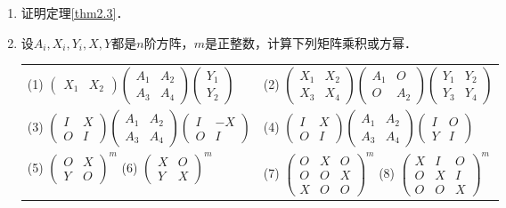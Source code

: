 \documentclass[a4paper,fontset=windows]{ctexbook}
\theoremstyle{definition}
\begin{document}
\begin{enumerate}
\item 证明定理\ref{thm2.3}．

\item 设$A_i,X_i,Y_i,X,Y$都是$n$阶方阵，$m$是正整数，计算下列矩阵乘积或方幂．

\hspace*{-6pt}\begin{tabular}{l@{\qquad}l}
(1) $\begin{pmatrix}X_1&X_2\end{pmatrix}\begin{pmatrix}A_1&A_2 \\ A_3&A_4\end{pmatrix}\begin{pmatrix}Y_1\\ Y_2\end{pmatrix}$ &
(2) $\begin{pmatrix}X_1&X_2 \\ X_3&X_4\end{pmatrix}\begin{pmatrix}A_1&O \\ O&A_2\end{pmatrix}\begin{pmatrix}Y_1&Y_2\\ Y_3&Y_4\end{pmatrix}$ \\
(3) $\begin{pmatrix}I&X \\ O&I\end{pmatrix}\begin{pmatrix}A_1&A_2 \\ A_3&A_4\end{pmatrix}\begin{pmatrix}I&-X\\ O&I\end{pmatrix}$ &
(4) $\begin{pmatrix}I&X \\ O&I\end{pmatrix}\begin{pmatrix}A_1&A_2 \\ A_3&A_4\end{pmatrix}\begin{pmatrix}I&O\\ Y&I\end{pmatrix}$ \\
(5) $\begin{pmatrix}O&X \\ Y&O\end{pmatrix}^m$ \qquad
(6) $\begin{pmatrix}X&O \\ Y&X\end{pmatrix}^m$ &
(7) $\begin{pmatrix}O&X&O \\ O&O&X \\ X&O&O\end{pmatrix}^m$ \qquad
(8) $\begin{pmatrix}X&I&O \\ O&X&I \\ O&O&X\end{pmatrix}^m$
\end{tabular}


\end{enumerate}
\end{document}
